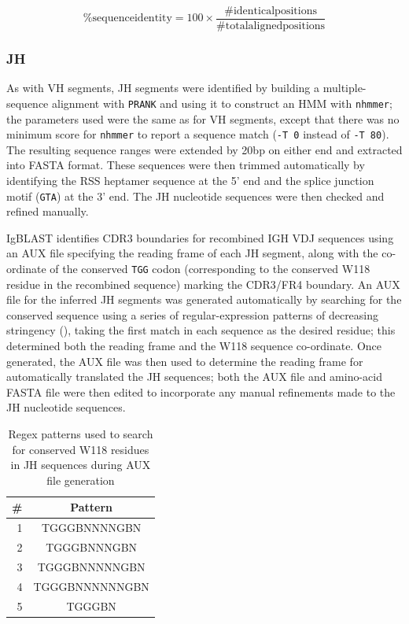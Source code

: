 \begin{equation}
\mathrm{\% sequence identity} = 100 \times \frac{\mathrm{\# identical positions}}{\mathrm{\# total aligned positions}}
\label{eq:pid}
\end{equation}

\subsubsection{JH}

As with VH segments, JH segments were identified by building a multiple-sequence alignment with \texttt{PRANK} and using it to construct an HMM with \texttt{nhmmer}; the parameters used were the same as for VH segments, except that there was no minimum score for \texttt{nhmmer} to report a sequence match (\lstinline{-T 0} instead of \lstinline{-T 80}). The resulting sequence ranges were extended by 20bp on either end and extracted into FASTA format. These sequences were then trimmed automatically by identifying the RSS heptamer sequence at the 5' end and the splice junction motif (\texttt{GTA}) at the 3' end. The JH nucleotide sequences were then checked and refined manually.

IgBLAST identifies CDR3 boundaries for recombined IGH VDJ sequences using an AUX file specifying the reading frame of each JH segment, along with the co-ordinate of the conserved \texttt{TGG} codon (corresponding to the conserved W118 residue in the recombined sequence) marking the CDR3/FR4 boundary. An AUX file for the inferred JH segments was generated automatically by searching for the conserved sequence using a series of regular-expression patterns of decreasing stringency (), taking the first match in each sequence as the desired residue; this determined both the reading frame and the W118 sequence co-ordinate. Once generated, the AUX file was then used to determine the reading frame for automatically translated the JH sequences; both the AUX file and amino-acid FASTA file were then edited to incorporate any manual refinements made to the JH nucleotide sequences.

\begin{table}
\caption{Regex patterns used to search for conserved W118 residues in JH sequences during AUX file generation}\label{tab:jh-aux-patterns}
\begin{tabular}{r>{\ttseries}c}\\\toprule  
\# & Pattern \\\midrule
1 & TGGGBNNNNGBN\\
2 & TGGGBNNNGBN\\
3 & TGGGBNNNNNGBN\\
4 & TGGGBNNNNNNGBN\\
5 & TGGGBN\\\bottomrule
\end{tabular}
\end{table}

